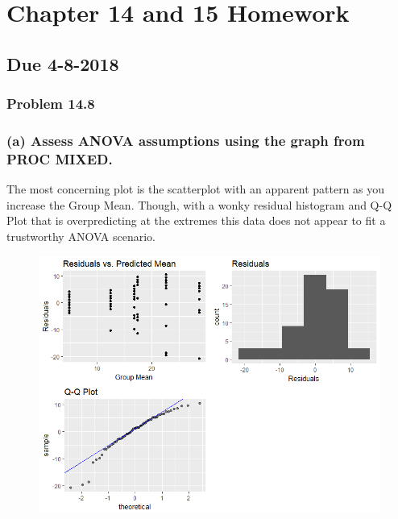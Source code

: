 \documentclass{article}
\begin{document}
\section*{Chapter 14 and 15 Homework}
\subsection*{Due 4-8-2018}
\subsubsection*{Problem 14.8}
\subsubsection*{ (a) Assess ANOVA assumptions using the graph from PROC MIXED.}
The most concerning plot is the scatterplot with an apparent pattern as you increase the Group Mean.  Though, with a wonky residual histogram and Q-Q Plot that is overpredicting at the extremes this data does not appear to fit a trustworthy ANOVA scenario.  
\begin{figure}[h]
\centering
\includegraphics[width = 1.0\textwidth]{ANOVAcheck148.png}
\end{figure}
\end{document}

